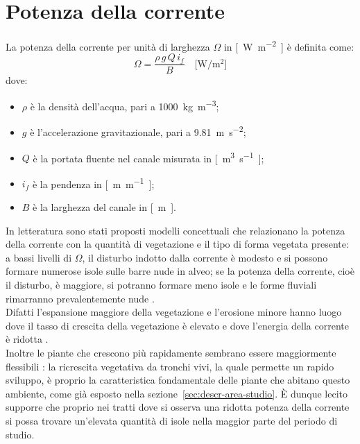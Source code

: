 \section{Potenza della corrente}
La potenza della corrente per unità di larghezza $\Omega$ in \si{[\watt\per\meter\tothe{2}]} è definita come:
%
\begin{equation}
	\label{eq:omega}
	\Omega = \frac{\rho \, g \, Q \, i_f}{B}
	\quad
	\si{[\watt\per\meter\tothe{2}]}
\end{equation}
%
dove:
%
\begin{itemize}
	\item $\rho$ è la densità dell'acqua, pari a \SI{1000}{\kilo\g\per\meter\tothe{3}};
	\item $g$ è l'accelerazione gravitazionale, pari a \SI{9.81}{\m\per\s\tothe{2}};
	\item $Q$ è la portata fluente nel canale misurata in \si{[\m\tothe{3}\per\s]};
	\item $i_f$ è la pendenza in \si{[\m\per\m]};
	\item $B$ è la larghezza del canale in \si{[\m]}.
\end{itemize}
%
In letteratura sono stati proposti modelli concettuali che relazionano la potenza della corrente con la quantità di vegetazione e il tipo di forma vegetata presente:
a bassi livelli di $\Omega$, il disturbo indotto dalla corrente è modesto e si possono formare numerose isole sulle barre nude in alveo;
se la potenza della corrente, cioè il disturbo, è maggiore, si potranno formare meno isole e le forme fluviali rimarranno prevalentemente nude .
\\
Difatti l'espansione maggiore della vegetazione e l'erosione minore hanno luogo dove il tasso di crescita della vegetazione è elevato e dove l'energia della corrente è ridotta .
\\
Inoltre le piante che crescono più rapidamente sembrano essere maggiormente flessibili : la ricrescita vegetativa da tronchi vivi, la quale permette un rapido sviluppo, è proprio la caratteristica fondamentale delle piante che abitano questo ambiente, come già esposto nella sezione~\ref{sec:descr-area-studio}.
È dunque lecito supporre che proprio nei tratti dove si osserva una ridotta potenza della corrente si possa trovare un'elevata quantità di isole nella maggior parte del periodo di studio.


